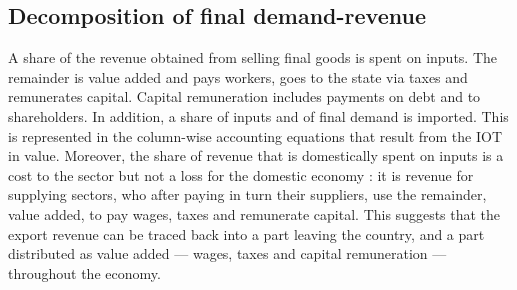 \documentclass[12pt,english]{article}
\begin{document}


\subsection{Decomposition of final demand-revenue} \label{Section_decomposition}

A share of the revenue obtained from selling final goods is spent on inputs. The remainder is value added and pays workers, goes to the state via taxes and remunerates capital. Capital remuneration includes payments on debt and to shareholders. In addition, a share of inputs and of final demand is imported. This is represented in the column-wise accounting equations that result from the IOT in value. Moreover, the share of revenue that is domestically spent on inputs is a cost to the sector but not a loss for the domestic economy : %
it is revenue for supplying sectors, who after paying in turn their suppliers, use the remainder, value added, to pay wages, taxes and remunerate capital. This suggests that the export revenue can be traced back into a part leaving the country, and a part distributed as value added --- wages, taxes and capital remuneration --- throughout the economy. 
\end{document}
